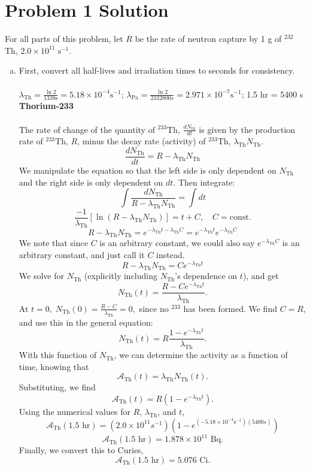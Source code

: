 \documentclass{report}
\newcommand{\tab}{\-\hspace{1.5cm}}
\begin{document}
\section*{Problem 1 Solution}


For all parts of this problem, let $R$ be the rate of neutron capture by 1 g of $^{232}$Th, $2.0 \times 10^{11} \;\text{s}^{-1}$.\\

\begin{enumerate}[a)]

\item

First, convert all half-lives and irradiation times to seconds for consistency.\\ 
\-\\
\tab $\lambda_{\text{Th}} = \frac{\ln{2}}{1338\text{s}} = 5.18\times10^{-4}\text{s}^{-1}$; \tab $\lambda_{\text{Pa}}=\frac{\ln{2}}{2332800s}=2.971\times10^{-7}\text{s}^{-1}$; \tab 1.5 hr = 5400 s\\

\textbf{Thorium-233}\\
\-\\
The rate of change of the quantity of $^{233}$Th, $\frac{dN_{\text{th}}}{dt}$ is given by the production rate of $^{233}$Th, $R$, minus the decay rate (activity) of $^{233}$Th, $\lambda_{\text{Th}}N_{\text{Th}}$.
$$\frac{dN_{\text{Th}}}{dt} = R - \lambda_{\text{Th}}N_{\text{Th}}$$
We manipulate the equation so that the left side is only dependent on $N_{\text{Th}}$ and the right side is only dependent on $dt$. Then integrate:
$$\int{\frac{dN_{\text{Th}}}{R-\lambda_{\text{Th}}N_{\text{Th}}}} = \int{dt}$$
$$\frac{-1}{\lambda_{\text{Th}}}[\ln(R-\lambda_{\text{Th}}N_{\text{Th}})] = t + C,\quad C=\text{const.}$$
$$R-\lambda_{\text{Th}}N_{\text{Th}} = e^{-\lambda_{\text{Th}}t -\lambda_{\text{Th}}C} = e^{-\lambda_{\text{Th}}t} e^{-\lambda_{\text{Th}}C}$$
We note that since $C$ is an arbitrary constant, we could also say $e^{-\lambda_{\text{Th}}C}$ is an arbitrary constant, and just call it $C$ instead.
$$ R-\lambda_{\text{Th}}N_{\text{Th}} = Ce^{-\lambda_{\text{Th}}t} $$
We solve for $N_{\text{Th}}$ (explicitly including $N_{\text{Th}}$'s dependence on $t$), and get
$$ N_{\text{Th}}(t) = \frac{R - Ce^{-\lambda_{\text{Th}}t}}{\lambda_{\text{Th}}} .$$
At $t=0,\; N_{\text{Th}}(0) = \frac{R - C}{\lambda_{\text{Th}}}=0,$ since no $^{233}$ has been formed. We find $C= R$, and use this in the general equation:
$$ N_{\text{Th}}(t) = R\frac{1 - e^{-\lambda_{\text{Th}}t}}{\lambda_{\text{Th}}}. $$
With this function of $N_{\text{Th}}$, we can determine the activity as a function of time, knowing that
$$ \mathcal{A}_{\text{Th}}(t) = \lambda_{\text{Th}}N_{\text{Th}}(t). $$
Substituting, we find
$$ \mathcal{A}_{\text{Th}}(t) = R(1-e^{-\lambda_{\text{Th}}t}) .$$
Using the numerical values for $R$, $\lambda_{\text{Th}}$, and $t$,
$$ \mathcal{A}_{\text{Th}}(1.5\text{ hr}) =(2.0\times10^{11}s^{-1})(1-e^{(-5.18\times10^{-4}\text{s}^{-1})(5400s)}) $$
$$ \mathcal{A}_{\text{Th}}(1.5\text{ hr}) = 1.878\times10^{11}\text{ Bq} .$$
Finally, we convert this to Curies,
$$\boxed{ \mathcal{A}_{\text{Th}}(1.5\text{ hr}) = 5.076\text{ Ci} }.$$


\end{enumerate}
\end{document}
